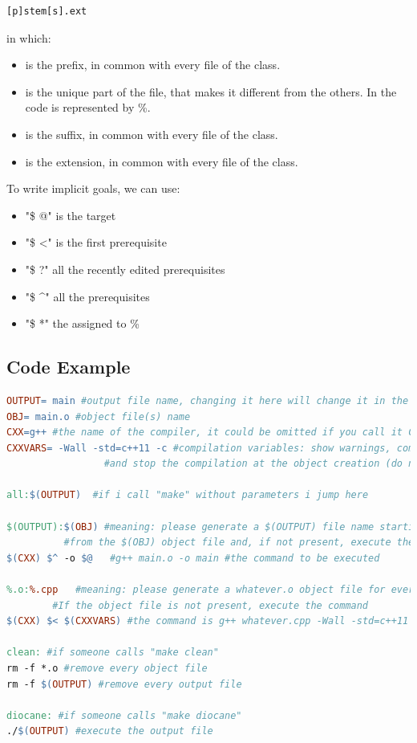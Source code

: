\begin{lstlisting}
[p]stem[s].ext
\end{lstlisting}
in which:
\begin{itemize}
	\item {} is the prefix, in common with every file of the class.
	\item {} is the unique part of the file, that makes it different from the others. In the code is represented by \%.
	\item {} is the suffix, in common with every file of the class.
	\item {} is the extension, in common with every file of the class.
\end{itemize}
To write implicit goals, we can use:
\begin{itemize}
	\item "\$ @" is the target
	\item "\$ \textless"  is the first prerequisite
	\item "\$ ?" all the recently edited prerequisites
	\item "\$ \textasciicircum" all the prerequisites
	\item "\$ *" the  assigned to \%
	
\end{itemize}
\pagebreak
\subsection{Code Example}

\begin{lstlisting}[language=make, basicstyle=\ttfamily \scriptsize]
OUTPUT= main #output file name, changing it here will change it in the whole file
OBJ= main.o #object file(s) name 
CXX=g++	#the name of the compiler, it could be omitted if you call it CXX: its a standard variable
CXXVARS= -Wall -std=c++11 -c #compilation variables: show warnings, compile with c++11 
			     #and stop the compilation at the object creation (do not link the file)

all:$(OUTPUT)  #if i call "make" without parameters i jump here

$(OUTPUT):$(OBJ) #meaning: please generate a $(OUTPUT) file name starting 
		  #from the $(OBJ) object file and, if not present, execute the command
$(CXX) $^ -o $@   #g++ main.o -o main #the command to be executed

%.o:%.cpp	#meaning: please generate a whatever.o object file for every whatever.cpp file. 
		#If the object file is not present, execute the command
$(CXX) $< $(CXXVARS) #the command is g++ whatever.cpp -Wall -std=c++11 -c

clean: #if someone calls "make clean"
rm -f *.o #remove every object file
rm -f $(OUTPUT) #remove every output file

diocane: #if someone calls "make diocane"
./$(OUTPUT) #execute the output file


\end{lstlisting}



